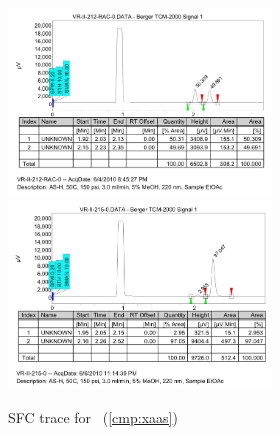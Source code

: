 \begin{figure}[h]
\centering
\includegraphics[width=2.75in]{chp_asymmetric/images/sfc/xaas-rac.png}
\includegraphics[width=2.75in]{chp_asymmetric/images/sfc/xaas.png}
\caption{SFC trace for \CMPxaas~(\ref{cmp:xaas})}
\vspace{-10pt}
\end{figure}

